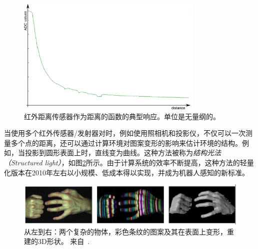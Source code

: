 \begin{figure}
	\centering
		\includegraphics[width=0.8\textwidth]{figs/epuckirsensor.png}
	\caption{红外距离传感器作为距离的函数的典型响应。单位是无量纲的。}
	\label{fig:epuckir}
\end{figure}


当使用多个红外传感器/发射器对时，例如使用照相机和投影仪，不仅可以一次测量多个点的距离，还可以通过计算环境对图案变形的影响来估计环境的结构。例如，当投影到圆形表面上时，直线变为曲线。这种方法被称为\emph{结构光法（Structured light）}，如图\ref{fig:struclight}所示。由于计算系统的效率不断提高，这种方法的轻量化版本在2010年左右以小规模、低成本得以实现，并成为机器人感知的新标准。

\begin{figure}
	\centering
		\includegraphics[width=\textwidth]{figs/structuredlight.png}
	\caption{从左到右：两个复杂的物体，彩色条纹的图案及其在表面上变形，重建的3D形状。 来自~\protect\cite{zhang2002rapid}.}
	\label{fig:struclight}
\end{figure}

